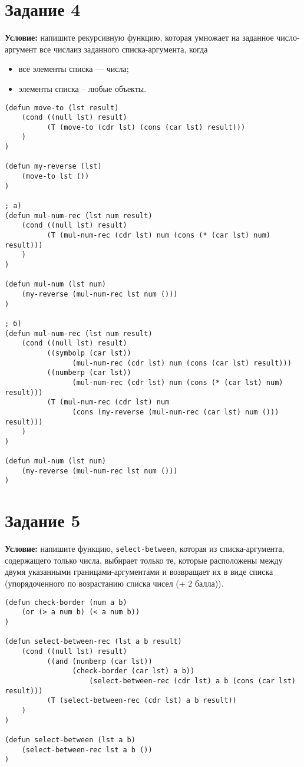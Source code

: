 \section{Задание 4}

\textbf{Условие:} напишите рекурсивную функцию, которая умножает на заданное число-аргумент все числаиз заданного списка-аргумента, когда
\begin{itemize}
    \item все элементы списка --- числа;
    \item элементы списка -- любые объекты.
\end{itemize}


\begin{lstlisting}
(defun move-to (lst result)
    (cond ((null lst) result)
          (T (move-to (cdr lst) (cons (car lst) result)))
    )
)

(defun my-reverse (lst)
    (move-to lst ())
)

; а)
(defun mul-num-rec (lst num result)
    (cond ((null lst) result)
          (T (mul-num-rec (cdr lst) num (cons (* (car lst) num) result)))
    )
)

(defun mul-num (lst num)
    (my-reverse (mul-num-rec lst num ()))
)

; б)
(defun mul-num-rec (lst num result)
    (cond ((null lst) result)
          ((symbolp (car lst)) 
                (mul-num-rec (cdr lst) num (cons (car lst) result)))
          ((numberp (car lst)) 
                (mul-num-rec (cdr lst) num (cons (* (car lst) num) result)))
          (T (mul-num-rec (cdr lst) num 
                (cons (my-reverse (mul-num-rec (car lst) num ())) result)))
    )
)

(defun mul-num (lst num)
    (my-reverse (mul-num-rec lst num ()))
)
\end{lstlisting}


\section{Задание 5}

\textbf{Условие:} напишите функцию, \texttt{select-between}, которая из списка-аргумента, содержащего только числа, выбирает только те, которые расположены между двумя указанными границами-аргументами и возвращает их в виде списка (упорядоченного по возрастанию списка чисел (+ 2 балла)).

\begin{lstlisting}
(defun check-border (num a b)
    (or (> a num b) (< a num b))
)

(defun select-between-rec (lst a b result)
    (cond ((null lst) result)
          ((and (numberp (car lst)) 
                (check-border (car lst) a b)) 
                    (select-between-rec (cdr lst) a b (cons (car lst) result)))
          (T (select-between-rec (cdr lst) a b result))
    )
)

(defun select-between (lst a b)
    (select-between-rec lst a b ())
)
\end{lstlisting}


